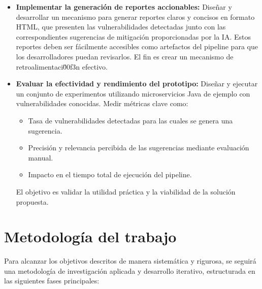 \begin{itemize}
    \item \textbf{Implementar la generación de reportes accionables:} Diseñar y desarrollar un mecanismo para generar reportes claros y concisos en formato HTML, que presenten las vulnerabilidades detectadas junto con las correspondientes sugerencias de mitigación proporcionadas por la IA. Estos reportes deben ser fácilmente accesibles como artefactos del pipeline para que los desarrolladores puedan revisarlos. El fin es crear un mecanismo de retroalimentaci\u00f3n efectivo.
    
    \item \textbf{Evaluar la efectividad y rendimiento del prototipo:} Diseñar y ejecutar un conjunto de experimentos utilizando microservicios Java de ejemplo con vulnerabilidades conocidas. Medir métricas clave como:
    \begin{itemize}
        \item Tasa de vulnerabilidades detectadas para las cuales se genera una sugerencia.
        \item Precisión y relevancia percibida de las sugerencias mediante evaluación manual.
        \item Impacto en el tiempo total de ejecución del pipeline.
    \end{itemize}
    El objetivo es validar la utilidad práctica y la viabilidad de la solución propuesta.
\end{itemize}

\section{Metodología del trabajo}\label{sec:metodologia_trabajo}

Para alcanzar los objetivos descritos de manera sistemática y rigurosa, se seguirá una metodología de investigación aplicada y desarrollo iterativo, estructurada en las siguientes fases principales:

